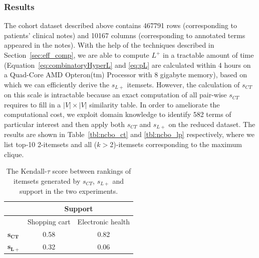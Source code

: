 \subsubsection{Results}
The cohort dataset described above contains 467791 rows (corresponding to patients' clinical notes) and 10167 columns (corresponding to annotated terms appeared in the notes). With the help of the techniques described in Section~\ref{sec:eff_comp}, we are able to compute $L^+$ in a tractable amount of time (Equation~\ref{eq:combinatoryHyperL} and \ref{eq:pL} are calculated within 4 hours on a Quad-Core AMD Opteron(tm) Processor with 8 gigabyte memory), based on which we can efficiently derive the $s_{L+}$ itemsets. However, the calculation of $s_{CT}$ on this scale is intractable because an exact computation of all pair-wise $s_{CT}$ requires to fill in a $|V|\times|V|$ similarity table. In order to ameliorate the computational cost, we exploit domain knowledge to identify 582 terms of particular interest and then apply both $s_{CT}$ and $s_{L+}$ on the reduced dataset. The results are shown in Table~\ref{tbl:ncbo_ct} and \ref{tbl:ncbo_lp} respectively, where we list top-10 2-itemsets and all ($k>$2)-itemsets corresponding to the maximum clique.

\begin{table}
\begin{center}
\begin{tabular}{l|c|c }
\hline
&\multicolumn{2}{c}{Support} \\
\hline
              & Shopping cart  &  Electronic health\\
\hline
$\mathbf{s_{CT}}$    & 0.58  & 0.82 \\
\hline
$\mathbf{s_{L+}}$    & 0.32  & 0.06 \\
\hline
\end{tabular}
\end{center}
\caption[A comparison between $s_{CT}$ and $s_{L+}$.]{\label{tbl:kendall} The Kendall-$\tau$ score between rankings of itemsets generated by $s_{CT}$, $s_{L+}$ and support in the two experiments.}
\end{table}

